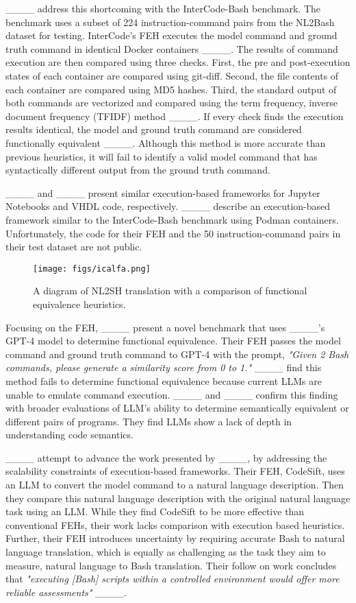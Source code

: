 ____ address this shortcoming with the InterCode-Bash benchmark. The benchmark uses a subset of 224 instruction-command pairs from the NL2Bash dataset for testing. InterCode's FEH executes the model command and ground truth command in identical Docker containers ____. The results of command execution are then compared using three checks. First, the pre and post-execution states of each container are compared using git-diff. Second, the file contents of each container are compared using MD5 hashes. Third, the standard output of both commands are vectorized and compared using the term frequency, inverse document frequency (TFIDF) method ____. If every check finds the execution results identical, the model and ground truth command are considered functionally equivalent ____. Although this method is more accurate than previous heuristics, it will fail to identify a valid model command that has syntactically different output from the ground truth command.

____ and ____ present similar execution-based frameworks for Jupyter Notebooks and VHDL code, respectively. ____ describe an execution-based framework similar to the InterCode-Bash benchmark using Podman containers. Unfortunately, the code for their FEH and the 50 instruction-command pairs in their test dataset are not public.

\begin{figure*}[t!]
  \centering
  \texttt{[image: figs/icalfa.png]}
  \caption{A diagram of NL2SH translation with a comparison of functional equivalence heuristics.}
  \label{fig:icalfa}
\end{figure*}

Focusing on the FEH, ____ present a novel benchmark that uses ____'s GPT-4 model to determine functional equivalence. Their FEH passes the model command and ground truth command to GPT-4 with the prompt, \textit{"Given 2 Bash commands, please generate a similarity score from 0 to 1."} ____ find this method fails to determine functional equivalence because current LLMs are unable to emulate command execution. ____ and ____ confirm this finding with broader evaluations of LLM's ability to determine semantically equivalent or different pairs of programs. They find LLMs show a lack of depth in understanding code semantics.

____ attempt to advance the work presented by ____, by addressing the scalability constraints of execution-based frameworks. Their FEH, CodeSift, uses an LLM to convert the model command to a natural language description. Then they compare this natural language description with the original natural language task using an LLM. While they find CodeSift to be more effective than conventional FEHs, their work lacks comparison with execution based heuristics. Further, their FEH introduces uncertainty by requiring accurate Bash to natural language translation, which is equally as challenging as the task they aim to measure, natural language to Bash translation. Their follow on work concludes that \textit{"executing [Bash] scripts within a controlled environment would offer more reliable assessments"} ____.

